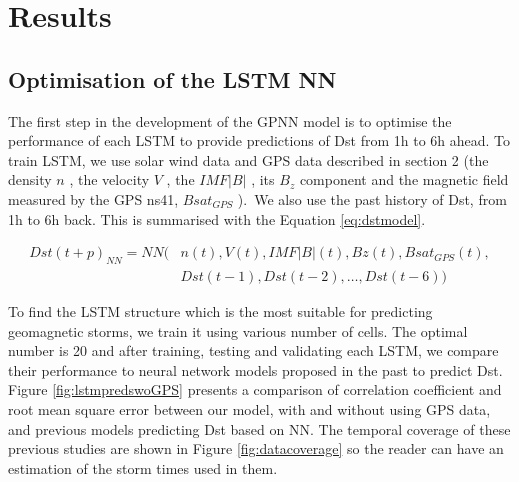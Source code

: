 \section{Results}


\subsection{Optimisation of the LSTM NN}


The first step in the development of the GPNN model is to optimise the performance of each 
LSTM to provide predictions of Dst from 1h to 6h ahead. To train LSTM, we use solar wind data and 
GPS data described in section 2 (the density \(  n \) , the velocity  \( V \) , the  
\( IMF  \vert B \vert  \) , its  \( B_{z} \)  component and the magnetic field measured 
by the GPS ns41,  \( Bsat_{GPS} \) ).\ We also use the past history of Dst, from 1h  to 6h back. 
This is summarised with the Equation \ref{eq:dstmodel}.



\begin{equation}\label{eq:dstmodel}
	\begin{aligned}
		Dst \left( t+p \right)_{NN} = NN ( 
			& n \left( t \right) , V \left( t \right) , IMF \vert B \vert  \left( t \right) ,Bz \left( t \right) , Bsat_{GPS} \left( t \right) , \\ 
			&	Dst \left( t-1 \right) ,Dst \left( t-2 \right) , \ldots ,Dst \left( t-6 \right) )
	\end{aligned}
\end{equation}

To find the LSTM structure which is the most suitable for predicting geomagnetic storms, we train it 
using various number of cells. The optimal number is 20 and after training, testing and validating each 
LSTM, we compare their performance to neural network models proposed in the past to predict Dst. 
Figure \ref{fig:lstmpredswoGPS} presents a  comparison of correlation coefficient and root mean square error 
between our model, with and without using GPS data, and previous models predicting Dst based on NN. 
The temporal coverage of these previous studies are shown in Figure \ref{fig:datacoverage} so the reader 
can have an estimation of the storm times used in them. 



